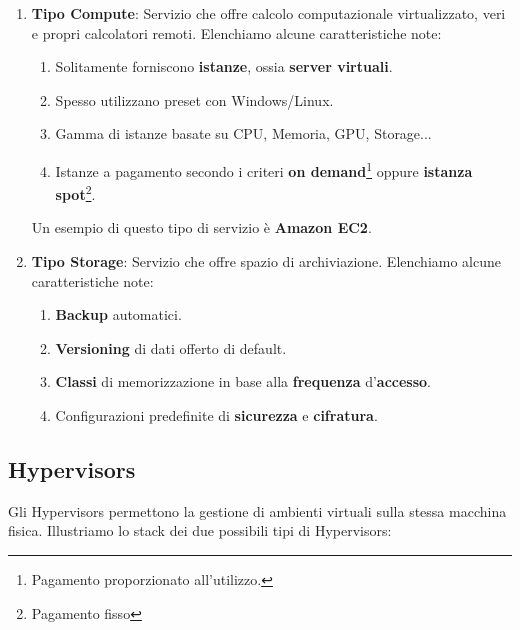 \documentclass{article}
\begin{document}
\begin{enumerate}
    \item \textbf{Tipo Compute}: Servizio che offre calcolo computazionale virtualizzato, veri e propri calcolatori remoti. Elenchiamo alcune caratteristiche note:
    \begin{enumerate}
        \item Solitamente forniscono \textbf{istanze}, ossia \textbf{server virtuali}.
        \item Spesso utilizzano preset con Windows/Linux.
        \item Gamma di istanze basate su CPU, Memoria, GPU, Storage...
        \item Istanze a pagamento secondo i criteri \textbf{on demand}\footnote{Pagamento proporzionato all'utilizzo.} oppure \textbf{istanza spot}\footnote{Pagamento fisso}.
    \end{enumerate}
    Un esempio di questo tipo di servizio è \textbf{Amazon EC2}.
    \item \textbf{Tipo Storage}: Servizio che offre spazio di archiviazione. Elenchiamo alcune caratteristiche note:
    \begin{enumerate}
        \item \textbf{Backup} automatici.
        \item \textbf{Versioning} di dati offerto di default.
        \item \textbf{Classi} di memorizzazione in base alla \textbf{frequenza} d'\textbf{accesso}.
        \item Configurazioni predefinite di \textbf{sicurezza} e \textbf{cifratura}.
    \end{enumerate}
\end{enumerate}

\subsection{Hypervisors}

Gli Hypervisors permettono la gestione di ambienti virtuali sulla stessa macchina fisica. Illustriamo lo stack dei due possibili tipi di Hypervisors:
\end{document}
